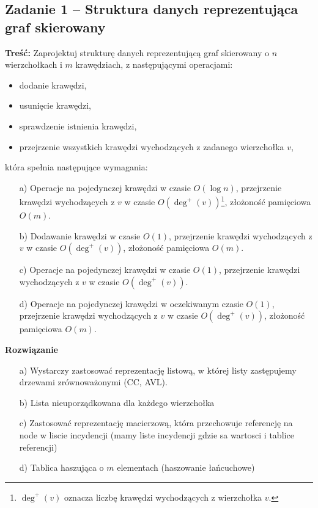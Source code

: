 \subsection{Zadanie 1 -- Struktura danych reprezentująca graf skierowany}

\textbf{Treść:} Zaprojektuj strukturę danych reprezentującą graf skierowany o $n$ wierzchołkach i $m$ krawędziach, z
następującymi operacjami:
\begin{itemize}
	\item dodanie krawędzi,
	\item usunięcie krawędzi,
	\item sprawdzenie istnienia krawędzi,
	\item przejrzenie wszystkich krawędzi wychodzących z zadanego wierzchołka $v$,
\end{itemize}
która spełnia następujące wymagania:
\begin{itemize}
	\item[a)] Operacje na pojedynczej krawędzi w czasie $O(\log n)$, przejrzenie krawędzi wychodzących z $v$ w czasie $O(\deg^+(v))$\footnote{$\deg^+(v)$ oznacza liczbę krawędzi wychodzących z wierzchołka $v$.}, 
	złożoność pamięciowa $O(m)$.
	\item[b)] Dodawanie krawędzi w czasie $O(1)$, przejrzenie krawędzi wychodzących z $v$ w czasie $O(\deg^+(v))$, złożoność
	pamięciowa $O(m)$.
	\item[c)] Operacje na pojedynczej krawędzi w czasie $O(1)$, przejrzenie krawędzi wychodzących z $v$ w czasie $O(\deg^+(v))$.
	\item[d)] Operacje na pojedynczej krawędzi w oczekiwanym czasie $O(1)$, przejrzenie krawędzi wychodzących z $v$ w czasie
	$O(\deg^+(v))$, złożoność pamięciowa $O(m)$.
\end{itemize}

\textbf{Rozwiązanie}
\begin{itemize}
	\item[a)] Wystarczy zastosować reprezentację listową, w której 
	listy zastępujemy drzewami zrównoważonymi (CC, AVL).
	\item[b)] Lista nieuporządkowana dla każdego wierzchołka
	\item[c)] Zastosować reprezentację macierzową, która przechowuje
	referencję na node w liscie incydencji (mamy liste incydencji
	gdzie sa wartosci i tablice referencji)
	\item[d)] Tablica haszująca o $m$ elementach (haszowanie łańcuchowe)
\end{itemize}

